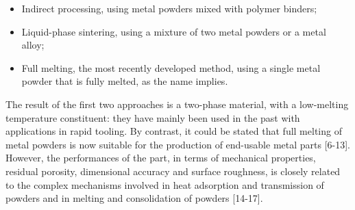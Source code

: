 \documentclass[10pt]{article}
\begin{document}
\begin{itemize}
  \item Indirect processing, using metal powders mixed with polymer binders;
  \item Liquid-phase sintering, using a mixture of two metal powders or a metal alloy;
  \item Full melting, the most recently developed method, using a single metal powder that is fully melted, as the name implies.
\end{itemize}

The result of the first two approaches is a two-phase material, with a low-melting temperature constituent: they have mainly been used in the past with applications in rapid tooling. By contrast, it could be stated that full melting of metal powders is now suitable for the production of end-usable metal parts [6-13]. However, the performances of the part, in terms of mechanical properties, residual porosity, dimensional accuracy and surface roughness, is closely related to the complex mechanisms involved in heat adsorption and transmission of powders and in melting and consolidation of powders [14-17].
\end{document}
